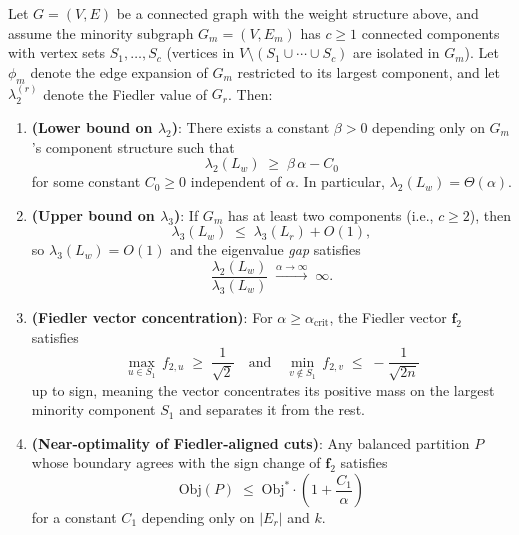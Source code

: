 \begin{proposition}
\label{prop:spectral}
Let $G = (V,E)$ be a connected graph with the weight structure above, and assume the minority subgraph $G_m = (V,E_m)$ has $c \geq 1$ connected components with vertex sets $S_1,\ldots,S_c$ (vertices in $V \setminus (S_1\cup\cdots\cup S_c)$ are isolated in $G_m$). Let $\phi_m$ denote the edge expansion of $G_m$ restricted to its largest component, and let $\lambda_2^{(r)}$ denote the Fiedler value of $G_r$. Then:

\begin{enumerate}
    \item \textbf{(Lower bound on $\lambda_2$)}: There exists a constant $\beta > 0$ depending only on $G_m$'s component structure such that
    \[
        \lambda_2(L_w) \;\geq\; \beta\,\alpha - C_0
    \]
    for some constant $C_0 \geq 0$ independent of $\alpha$. In particular, $\lambda_2(L_w) = \Theta(\alpha)$.

    \item \textbf{(Upper bound on $\lambda_3$)}: If $G_m$ has at least two components (i.e., $c \geq 2$), then
    \[
        \lambda_3(L_w) \;\leq\; \lambda_3(L_r) + O(1),
    \]
    so $\lambda_3(L_w) = O(1)$ and the eigenvalue \emph{gap} satisfies
    \[
        \frac{\lambda_2(L_w)}{\lambda_3(L_w)} \;\xrightarrow{\alpha\to\infty}\; \infty.
    \]

    \item \textbf{(Fiedler vector concentration)}: For $\alpha \geq \alpha_{\text{crit}}$, the Fiedler vector $\mathbf{f}_2$ satisfies
    \[
        \max_{u \in S_1}\,f_{2,u} \;\geq\; \frac{1}{\sqrt{2}} \quad \text{and} \quad \min_{v \notin S_1}\,f_{2,v} \;\leq\; -\frac{1}{\sqrt{2n}}
    \]
    up to sign, meaning the vector concentrates its positive mass on the largest minority component $S_1$ and separates it from the rest.

    \item \textbf{(Near-optimality of Fiedler-aligned cuts)}: Any balanced partition $P$ whose boundary agrees with the sign change of $\mathbf{f}_2$ satisfies
    \[
        \mathrm{Obj}(P) \;\leq\; \mathrm{Obj}^* \cdot \left(1 + \frac{C_1}{\alpha}\right)
    \]
    for a constant $C_1$ depending only on $|E_r|$ and $k$.
\end{enumerate}
\end{proposition}

